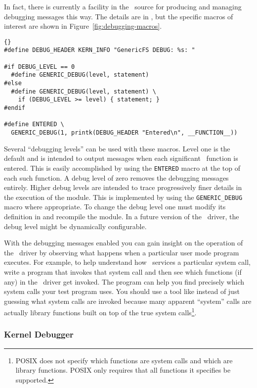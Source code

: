 In fact, there is currently a facility in the \GenericFS\ source for producing and managing
debugging messages this way. The details are in , but the specific macros of
interest are shown in Figure~\ref{fig:debugging-macros}.

\begin{figure*}[htbp]
  \centering
  \begin{wbigbox}
\begin{lstlisting}{}
#define DEBUG_HEADER KERN_INFO "GenericFS DEBUG: %s: "

#if DEBUG_LEVEL == 0
  #define GENERIC_DEBUG(level, statement)
#else
  #define GENERIC_DEBUG(level, statement) \
    if (DEBUG_LEVEL >= level) { statement; }
#endif

#define ENTERED \
  GENERIC_DEBUG(1, printk(DEBUG_HEADER "Entered\n", __FUNCTION__))
\end{lstlisting}
  \end{wbigbox}
  \caption{\GenericFS\ Debugging Macros (in )}
  \label{fig:debugging-macros}
\end{figure*}

Several ``debugging levels'' can be used with these macros. Level one is the default and is
intended to output messages when each significant \GenericFS\ function is entered. This is
easily accomplished by using the \texttt{ENTERED} macro at the top of each such function. A
debug level of zero removes the debugging messages entirely. Higher debug levels are intended to
trace progressively finer details in the execution of the module. This is implemented by using
the \texttt{GENERIC\-\_DEBUG} macro where appropriate. To change the debug level one must modify
its definition in \filename{global.h} and recompile the module. In a future version of the
\GenericFS\ driver, the debug level might be dynamically configurable.

With the debugging messages enabled you can gain insight on the operation of the \GenericFS\
driver by observing what happens when a particular user mode program executes. For example, to
help understand how \GenericFS\ services a particular system call, write a program that invokes
that system call and then see which functions (if any) in the \GenericFS\ driver get invoked.
The program \command{strace} can help you find precisely which system calls your test program
uses. You should use a tool like \command{strace} instead of just guessing what system calls are
invoked because many apparent ``system'' calls are actually library functions built on top of
the true system calls\footnote{POSIX does not specify which functions are system calls and which
  are library functions. POSIX only requires that all functions it specifies be supported.}.

\subsubsection{Kernel Debugger}

